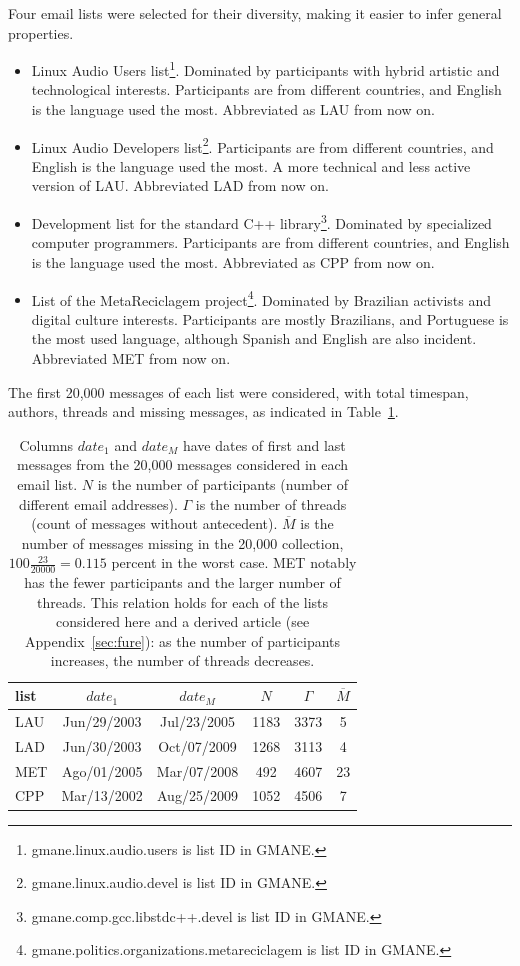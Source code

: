 \documentclass[%
 aip,
 jmp,%
 amsmath,amssymb,
 reprint,%
]{revtex4-1}
\begin{document}
Four email lists were selected for their diversity, making it easier to infer general properties.
\begin{itemize}
    \item Linux Audio Users list\footnote{gmane.linux.audio.users is list ID in GMANE.}. Dominated by participants with hybrid artistic and technological interests. Participants are from different countries, and English is the language used the most. Abbreviated as LAU from now on.
    \item Linux Audio Developers list\footnote{gmane.linux.audio.devel is list ID in GMANE.}. Participants are from different countries, and English is the language used the most. A more technical and less active version of LAU. Abbreviated LAD from now on.
    \item Development list for the standard C++ library\footnote{gmane.comp.gcc.libstdc++.devel is list ID in GMANE.}. Dominated by specialized computer programmers. Participants are from different countries, and English is the language used the most. Abbreviated as CPP from now on.
    \item List of the MetaReciclagem project\footnote{gmane.politics.organizations.metareciclagem is list ID in GMANE.}. Dominated by Brazilian activists and digital culture interests. Participants are mostly Brazilians, and Portuguese is the most used language, although Spanish and English are also incident. Abbreviated MET from now on.
\end{itemize} 

 The first 20,000 messages of each list were considered, with total timespan, authors, threads and missing messages, as indicated in Table~\ref{geralListas}.

\begin{table}
  \centering
  \caption{Columns $date_1$ and $date_M$ have dates of first and last messages from the 20,000 messages considered in each email list.
$N$ is the number of participants (number of different email addresses).
$\Gamma$ is the number of threads (count of messages without antecedent).
$\overline{M}$ is the number of messages missing in the 20,000 collection, $100\frac{23}{20000}=0.115$ percent in the worst case.
MET notably has the fewer participants and the larger number of threads.
This relation holds for each of the lists considered here and a derived article (see Appendix~\ref{sec:fure}): as the number of participants increases, the number of threads decreases.}
  \label{geralListas}
  \begin{tabular}{|l|c|c|c|c|c|}\hline
list & $date_1$ & $date_{M}$    & $N$  & $\Gamma$ & $\overline{M}$ \\\hline
LAU  & Jun/29/2003 & Jul/23/2005 & 1183 & 3373 & 5 \\
LAD  & Jun/30/2003 & Oct/07/2009 & 1268 & 3113 & 4 \\
MET  & Ago/01/2005 & Mar/07/2008 & 492  & 4607 & 23 \\
CPP  & Mar/13/2002 & Aug/25/2009 & 1052 & 4506 & 7 \\ \hline
  \end{tabular}
\end{table}
\end{document}
